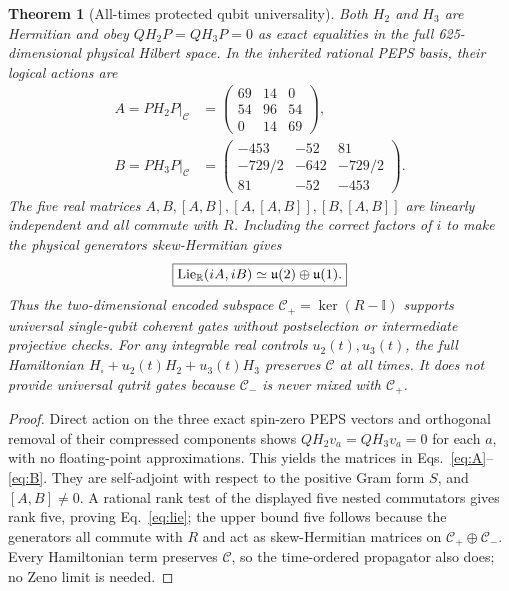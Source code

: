 \documentclass[aps,pra,twocolumn,nofootinbib,superscriptaddress,10pt]{revtex4-2}
\newtheorem{theorem}{Theorem}
\newcommand{\Cc}{\mathcal C}\newcommand{\HH}{\mathcal H}\newcommand{\Id}{\mathbb I}
\begin{document}
\begin{theorem}[All-times protected qubit universality]\label{thm:controls}
Both $H_2$ and $H_3$ are Hermitian and obey $QH_2P=QH_3P=0$ \emph{as exact equalities in the full 625-dimensional physical Hilbert space}. In the inherited rational PEPS basis, their logical actions are
\begin{align}
A=PH_2P\vert_\Cc&=\begin{pmatrix}69&14&0\\54&96&54\\0&14&69\end{pmatrix},\label{eq:A}\\
B=PH_3P\vert_\Cc&=\begin{pmatrix}-453&-52&81\\-729/2&-642&-729/2\\81&-52&-453\end{pmatrix}.\label{eq:B}
\end{align}
The five real matrices $A,B,[A,B],[A,[A,B]],[B,[A,B]]$ are linearly independent and all commute with $R$. Including the correct factors of $i$ to make the physical generators skew-Hermitian gives
\begin{equation}\label{eq:lie}
\boxed{\operatorname{Lie}_{\mathbb R}(iA,iB)\simeq\mathfrak u(2)\oplus\mathfrak u(1).}
\end{equation}
Thus the two-dimensional encoded subspace $\Cc_+=\ker(R-\Id)$ supports universal \emph{single-qubit} coherent gates without postselection or intermediate projective checks. For any integrable real controls $u_2(t),u_3(t)$, the full Hamiltonian $H_{\square}+u_2(t)H_2+u_3(t)H_3$ preserves $\Cc$ at all times. It does not provide universal qutrit gates because $\Cc_-$ is never mixed with $\Cc_+$.
\end{theorem}
\begin{proof}
Direct action on the three exact spin-zero PEPS vectors and orthogonal removal of their compressed components shows $QH_2v_a=QH_3v_a=0$ for each $a$, with no floating-point approximations. This yields the matrices in Eqs.~\eqref{eq:A}--\eqref{eq:B}. They are self-adjoint with respect to the positive Gram form $S$, and $[A,B]\ne0$. A rational rank test of the displayed five nested commutators gives rank five, proving Eq.~\eqref{eq:lie}; the upper bound five follows because the generators all commute with $R$ and act as skew-Hermitian matrices on $\Cc_+\oplus\Cc_-$. Every Hamiltonian term preserves $\Cc$, so the time-ordered propagator also does; no Zeno limit is needed.\end{proof}
\end{document}
